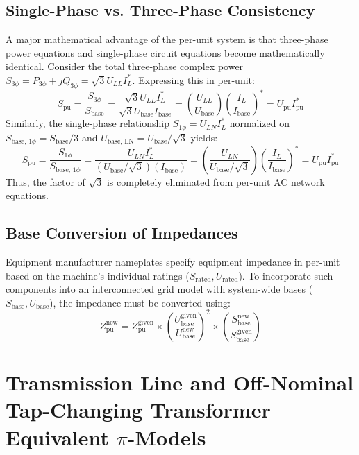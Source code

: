 \documentclass[12pt,a4paper,oneside]{report}
\begin{document}
\subsection{Single-Phase vs. Three-Phase Consistency}
A major mathematical advantage of the per-unit system is that three-phase power equations and single-phase circuit equations become mathematically identical. Consider the total three-phase complex power $S_{\text{3}\phi} = P_{\text{3}\phi} + jQ_{\text{3}\phi} = \sqrt{3} U_{LL} I_L^*$. Expressing this in per-unit:
\begin{equation}
S_{\text{pu}} = \frac{S_{\text{3}\phi}}{S_{\text{base}}} = \frac{\sqrt{3} U_{LL} I_L^*}{\sqrt{3} U_{\text{base}} I_{\text{base}}} = \left(\frac{U_{LL}}{U_{\text{base}}}\right) \left(\frac{I_L}{I_{\text{base}}}\right)^* = U_{\text{pu}} I_{\text{pu}}^*
\end{equation}
Similarly, the single-phase relationship $S_{\text{1}\phi} = U_{LN} I_L^*$ normalized on $S_{\text{base, 1}\phi} = S_{\text{base}} / 3$ and $U_{\text{base, LN}} = U_{\text{base}} / \sqrt{3}$ yields:
\begin{equation}
S_{\text{pu}} = \frac{S_{\text{1}\phi}}{S_{\text{base, 1}\phi}} = \frac{U_{LN} I_L^*}{(U_{\text{base}}/\sqrt{3})(I_{\text{base}})} = \left(\frac{U_{LN}}{U_{\text{base}}/\sqrt{3}}\right) \left(\frac{I_L}{I_{\text{base}}}\right)^* = U_{\text{pu}} I_{\text{pu}}^*
\end{equation}
Thus, the factor of $\sqrt{3}$ is completely eliminated from per-unit AC network equations.

\subsection{Base Conversion of Impedances}
Equipment manufacturer nameplates specify equipment impedance in per-unit based on the machine's individual ratings ($S_{\text{rated}}, U_{\text{rated}}$). To incorporate such components into an interconnected grid model with system-wide bases ($S_{\text{base}}, U_{\text{base}}$), the impedance must be converted using:
\begin{equation}
Z_{\text{pu}}^{\text{new}} = Z_{\text{pu}}^{\text{given}} \times \left(\frac{U_{\text{base}}^{\text{given}}}{U_{\text{base}}^{\text{new}}}\right)^2 \times \left(\frac{S_{\text{base}}^{\text{new}}}{S_{\text{base}}^{\text{given}}}\right)
\end{equation}

\section{Transmission Line and Off-Nominal Tap-Changing Transformer Equivalent $\pi$-Models}
\end{document}
